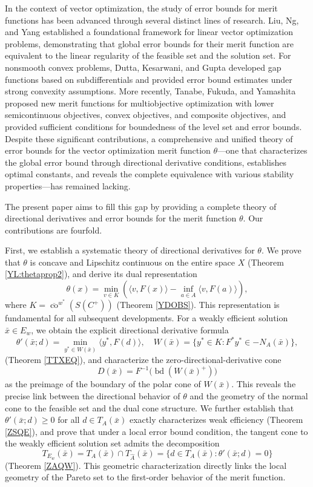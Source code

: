 \documentclass[11pt]{article}
\begin{document}
  

In the context of vector optimization, the study of error bounds for merit functions has been advanced through several distinct lines of research. Liu, Ng, and Yang \cite{LiuNgYang2009} established a foundational framework for linear vector optimization problems, demonstrating that global error bounds for their merit function are equivalent to the linear regularity of the feasible set and the solution set. For nonsmooth convex problems, Dutta, Kesarwani, and Gupta \cite{DKG2017} developed gap functions based on subdifferentials and provided error bound estimates under strong convexity assumptions. More recently, Tanabe, Fukuda, and Yamashita \cite{TanabeNew} proposed new merit functions
for multiobjective optimization with lower semicontinuous objectives, convex objectives, and composite objectives, and provided sufficient conditions for boundedness of the level set and error bounds. Despite these significant contributions, a comprehensive and unified theory of error bounds for the vector optimization merit function \(\theta\)---one that   characterizes the global error bound through directional derivative conditions, establishes optimal constants, and reveals the complete equivalence with various stability properties---has remained lacking.

The present paper aims to fill this gap by providing a complete theory of directional derivatives and error bounds for the merit function \(\theta\). Our contributions are fourfold.

First, we establish a systematic theory of directional derivatives for \(\theta\). We prove that \(\theta\) is concave and Lipschitz continuous on the entire space \(X\) (Theorem \ref{YL:thetaprop2}), and derive its dual representation
\[
\theta(x)=\min_{v\in K}\left(\langle v,F(x)\rangle-\inf_{a\in A}\langle v,F(a)\rangle\right),
\]
where \(K=\overline{\operatorname{co}}^{w^*}(S(C^+))\)  (Theorem \ref{YDOBS}). This representation is fundamental for all subsequent developments. For a weakly efficient solution \(\bar x\in E_w\), we obtain the explicit directional derivative formula
\[
\theta'(\bar x;d)=\min_{y^*\in W(\bar x)}\langle y^*,F(d)\rangle,
\quad
W(\bar x)=\{y^*\in K:F^*y^*\in -N_A(\bar x)\},
\]
(Theorem  \ref{TTXEQ}), and characterize the zero-directional-derivative cone
\[
D(\bar x)=F^{-1}\bigl(\operatorname{bd}(W(\bar x)^+)\bigr)
\]
as the preimage of the boundary of the polar cone of \(W(\bar x)\). This reveals the precise link between the directional behavior of \(\theta\) and the geometry of the normal cone to the feasible set and the dual cone structure. We further establish that \(\theta'(\bar x;d)\ge 0\) for all \(d\in T_A(\bar x)\) exactly characterizes weak efficiency (Theorem \ref{ZSQE}), and prove that under a local error bound condition, the tangent cone to the weakly efficient solution set admits the decomposition
\[
T_{E_w}(\bar x)=T_A(\bar x)\cap T_{\widehat A}(\bar x)=\{d\in T_A(\bar x):\theta'(\bar x;d)=0\}
\]
(Theorem  \ref{ZAQW}). This geometric characterization directly links the local geometry of the Pareto set to the first-order behavior of the merit function.
\end{document}
